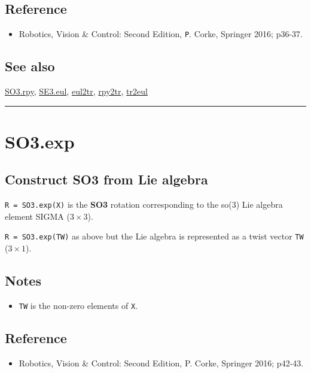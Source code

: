 \subsection*{Reference}
\begin{itemize}
  \item Robotics, Vision \& Control: Second Edition, \texttt{P}. Corke, Springer 2016; p36-37.
\end{itemize}

\subsection*{See also}


\hyperlink{SO3.rpy}{\color{blue} SO3.rpy}, \hyperlink{SE3.eul}{\color{blue} SE3.eul}, \hyperlink{eul2tr}{\color{blue} eul2tr}, \hyperlink{rpy2tr}{\color{blue} rpy2tr}, \hyperlink{tr2eul}{\color{blue} tr2eul}

\vspace{1.5ex}\hrule

\hypertarget{SO3.exp}{\section*{SO3.exp}}
\subsection*{Construct SO3 from Lie algebra}


\texttt{R = SO3.exp(X)} is the \textbf{\color{red} SO3} rotation corresponding to the so(3)
Lie algebra element SIGMA ($3 \times 3$).



\texttt{R = SO3.exp(TW)} as above but the Lie algebra is represented
as a twist vector \texttt{TW} ($3 \times 1$).


\subsection*{Notes}
\begin{itemize}
  \item \texttt{TW} is the non-zero elements of \texttt{X}.
\end{itemize}

\subsection*{Reference}
\begin{itemize}
  \item Robotics, Vision \& Control: Second Edition, P. Corke, Springer 2016; p42-43.
\end{itemize}

